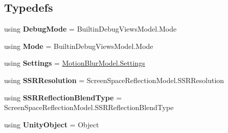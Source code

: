 \subsection*{Typedefs}
\begin{DoxyCompactItemize}
\item 
\mbox{\label{namespace_unity_engine_1_1_post_processing_ab2cfc5e1c58b5ee2672332ca96dcb2a0}} 
using {\bfseries Debug\+Mode} = Builtin\+Debug\+Views\+Model.\+Mode
\item 
\mbox{\label{namespace_unity_engine_1_1_post_processing_a39931777603dcd1a2aac4ffd3b137e62}} 
using {\bfseries Mode} = Builtin\+Debug\+Views\+Model.\+Mode
\item 
\mbox{\label{namespace_unity_engine_1_1_post_processing_a592ef3c37c37720c9148658370d5e39b}} 
using {\bfseries Settings} = \mbox{\hyperlink{struct_unity_engine_1_1_post_processing_1_1_motion_blur_model_1_1_settings}{Motion\+Blur\+Model.\+Settings}}
\item 
\mbox{\label{namespace_unity_engine_1_1_post_processing_a77cd6d8a0741cbfd993f74786b96c92f}} 
using {\bfseries S\+S\+R\+Resolution} = Screen\+Space\+Reflection\+Model.\+S\+S\+R\+Resolution
\item 
\mbox{\label{namespace_unity_engine_1_1_post_processing_ad79ff59bbe939b6e24585aaeabd4c356}} 
using {\bfseries S\+S\+R\+Reflection\+Blend\+Type} = Screen\+Space\+Reflection\+Model.\+S\+S\+R\+Reflection\+Blend\+Type
\item 
\mbox{\label{namespace_unity_engine_1_1_post_processing_a4d6b4edb7079fca849178803e29c49bb}} 
using {\bfseries Unity\+Object} = Object
\end{DoxyCompactItemize}
